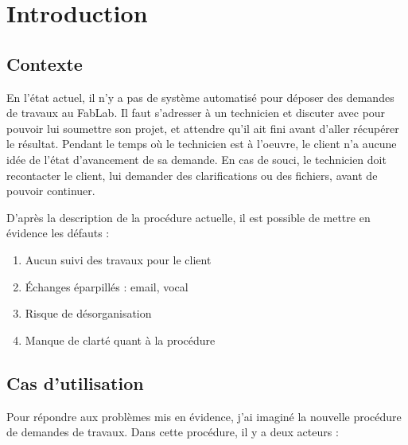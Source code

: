 \documentclass[
    iai, %
    eai, %
]{heig-tb}
\begin{document}
\maketitle
\frontmatter
\clearemptydoublepage

\preamble
\authentification

\begin{abstract}
  
\end{abstract}

\clearemptydoublepage
{
  \tableofcontents
  \let\cleardoublepage\clearpage
  \listoffigures
  \let\cleardoublepage\clearpage
  \listoftables
  \let\cleardoublepage\clearpage
  \listoflistings
}

\printnomenclature
\clearemptydoublepage
{}


\mainmatter
\chapter{Introduction}
\section{Contexte}
En l'état actuel, il n'y a pas de système automatisé pour déposer des demandes de travaux au FabLab. Il faut s'adresser à un technicien et discuter avec pour pouvoir lui soumettre son projet, et attendre qu'il ait fini avant d'aller récupérer le résultat. Pendant le temps où le technicien est à l'oeuvre, le client n'a aucune idée de l'état d'avancement de sa demande. En cas de souci, le technicien doit recontacter le client, lui demander des clarifications ou des fichiers, avant de pouvoir continuer.

D'après la description de la procédure actuelle, il est possible de mettre en évidence les défauts :

\begin{enumerate}
  \item Aucun suivi des travaux pour le client
  \item Échanges éparpillés : email, vocal
  \item Risque de désorganisation
  \item Manque de clarté quant à la procédure
\end{enumerate}

\section{Cas d'utilisation}
Pour répondre aux problèmes mis en évidence, j'ai imaginé la nouvelle procédure de demandes de travaux. Dans cette procédure, il y a deux acteurs :
\end{document}

